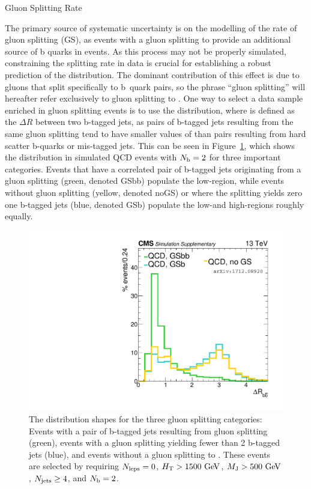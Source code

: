 \begin{section}{Gluon Splitting Rate}

The primary source of systematic uncertainty is on the modelling of the rate of gluon splitting (GS), as events with a gluon splitting to \bbbar provide an additional source of b quarks in events.
As this process may not be properly simulated, constraining the splitting rate in data is crucial for establishing a robust prediction of the \Nb distribution.
The dominant contribution of this effect is due to gluons that split specifically to b~quark pairs, so the phrase ``gluon splitting'' will hereafter refer exclusively to gluon splitting to \bbbar.
One way to select a data sample enriched in gluon splitting events is to use the \dRbb distribution, where \dRbb is defined as the $\Delta R$ between two b-tagged jets, as pairs of b-tagged jets resulting from the same gluon splitting tend to have smaller values of \dRbb than pairs resulting from hard scatter b-quarks or mis-tagged jets.
This can be seen in Figure~\ref{fig:dRbb_shapes}, which shows the \dRbb distribution in simulated QCD events with $N_{\mathrm{b}} = 2$ for three important categories.
Events that have a correlated pair of b-tagged jets originating from a gluon splitting (green, denoted GSbb) populate the low-\dRbb region, while events without gluon splitting (yellow, denoted noGS) or where the splitting yields zero one b-tagged jets (blue, denoted GSb) populate the low-and high-\dRbb regions roughly equally.

\begin{figure}[tbp!]
\begin{center}
\includegraphics[angle=0,width=0.60\columnwidth]{fig/dRbb_shapes.pdf}
\end{center}
\caption{The \dRbb distribution shapes for the three gluon splitting categories: 
Events with a pair of b-tagged jets resulting from gluon splitting (green), events with a gluon splitting yielding fewer than 2 b-tagged jets (blue), and events without a gluon splitting to \bbbar.
These events are selected by requiring $N_{\mathrm{leps}} = 0$, $H_{\mathrm{T}} > 1500~\mathrm{Ge\kern -0.1em V}$, $M_{\mathrm{J}} > 500~\mathrm{Ge\kern -0.1em V}$, $N_{\mathrm{jets}} \geq 4$, and $N_{\mathrm{b}} = 2$.}
\label{fig:dRbb_shapes}
\end{figure}


\end{section}
